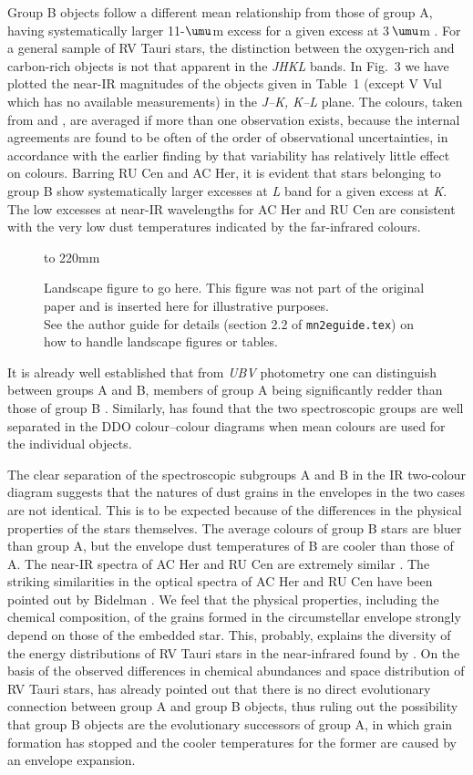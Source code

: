 \documentclass[useAMS,usedcolumn,usegraphicx,usenatbib]{mn2e}
\begin{document}
Group B objects follow a different mean relationship from those of
group A, having systematically larger 11-$\umu$m excess for a
given excess at 3$\,\umu$m \citep{b15}. For a general sample of RV
Tauri stars, the distinction between the oxygen-rich and
carbon-rich objects is not that apparent in the {\it JHKL\/}
bands. In Fig.~3 we have plotted the near-IR magnitudes of the
objects given in Table~1 (except V Vul which has no available
measurements) in the {\it J--K, K--L\/} plane. The colours,  taken
from \citet{b15} and \citet{b9}, are averaged if more than one
observation exists, because the internal agreements are found to
be often of the order of observational uncertainties, in
accordance with the earlier finding by \citet{b5} that variability
has relatively little effect on colours. Barring RU Cen and AC
Her, it is evident that stars belonging to group B show
systematically larger excesses at {\it L\/} band for a given
excess at {\it K}. The low excesses at near-IR wavelengths for AC
Her and RU Cen are consistent with the very low dust temperatures
indicated by the far-infrared colours.
%
\begin{figure*}
\vbox to 220mm{\vfil Landscape figure to go here. This figure was
not part of the original paper and is inserted here for
illustrative purposes.\\ See the author guide for details (section
2.2 of \verb|mn2eguide.tex|) on how to handle landscape figures or
tables. \caption{} \vfil} \label{landfig}
\end{figure*}

It is already well established that from {\it UBV\/} photometry
one can distinguish between groups A and B,  members of group A
being significantly redder than those of group B \citep{b20}.
Similarly, \citet{b4} has found that the two spectroscopic groups
are well separated in the DDO colour--colour diagrams when mean
colours are used for the individual objects.

The clear separation of the spectroscopic subgroups A and  B in
the IR two-colour diagram suggests that the natures of dust grains
in the envelopes in the two cases are not  identical. This is to
be expected because of the differences in the physical properties
of the stars themselves. The average colours of group B stars are
bluer than group A, but the envelope dust temperatures of B are
cooler than those of A. The near-IR spectra of AC Her and RU Cen
are extremely similar \citep{b6}. The striking similarities in the
optical spectra of AC Her and RU Cen have been pointed out by
Bidelman \citep{b18}. We feel that the physical properties,
including the chemical composition, of the grains  formed in the
circumstellar envelope strongly depend on those of the embedded
star. This, probably, explains the diversity of the energy
distributions of RV Tauri stars in the near-infrared found by
\citet{b6}. On the basis of the observed differences in chemical
abundances and space distribution of RV Tauri stars, \citet{b15}
has already pointed out that there is no direct evolutionary
connection between group A and group B objects, thus ruling out
the possibility that group B objects are the evolutionary
successors of group A, in which grain formation has stopped and
the cooler temperatures for the former are caused by an envelope
expansion.
\end{document}
